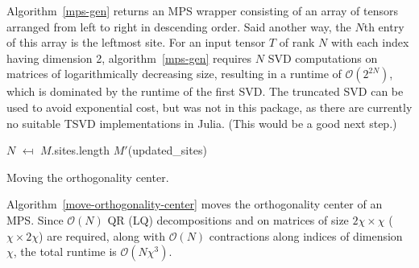 \documentclass[12pt]{article}
\begin{document}
\begin{multicols}{2}
		Algorithm~\ref{mps-gen} returns an MPS wrapper consisting of an array of
		tensors arranged from left to right in descending order. Said another way,
		the $N$th entry of this array is the leftmost site. For an input tensor $T$ of rank $N$ with each index having dimension 2, algorithm~\ref{mps-gen} requires $N$ SVD computations on matrices of logarithmically decreasing size, resulting in a runtime of $\mathcal{O}(2^{2N})$, which is dominated by the runtime of the first SVD. The truncated SVD can be used to avoid exponential cost, but was not in this package, as there are currently no suitable TSVD implementations in Julia. (This would be a good next step.)

	\begin{algorithm}[H]
		$N$ $\mapsfrom$ $M$.sites.length\;
		\Return $M'$(updated\_sites)\;
		\caption{Moving the orthogonality center.}
		\label{move-orthogonality-center}
	\end{algorithm}
	Algorithm~\ref{move-orthogonality-center} moves the orthogonality center of an MPS. Since $\mathcal{O}(N)$ QR (LQ) decompositions and on matrices of size $2\chi\times\chi$ ($\chi\times2\chi$) are required, along with $\mathcal{O}(N)$ contractions along indices of dimension $\chi$, the total runtime is $\mathcal{O}(N\chi^3)$.


\end{multicols}
\end{document}
